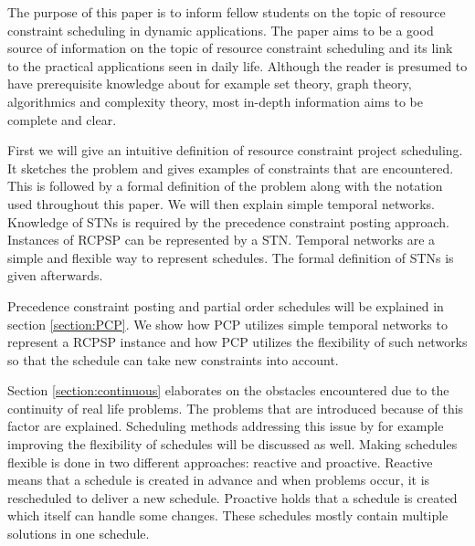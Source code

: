 \documentclass{article}
\begin{document}
The purpose of this paper is to inform fellow students on the topic of resource constraint scheduling in dynamic applications.
The paper aims to be a good source of information on the topic of resource constraint scheduling and its link to the practical applications seen in daily life.
Although the reader is presumed to have prerequisite knowledge about for example set theory, graph theory, algorithmics and complexity theory, most in-depth information aims to be complete and clear.

First we will give an intuitive definition of resource constraint project scheduling. 
It sketches the problem and gives examples of constraints that are encountered. 
This is followed by a formal definition of the problem along with the notation used throughout this paper. 
We will then explain simple temporal networks. 
Knowledge of STNs is required by the precedence constraint posting approach. Instances of RCPSP can be represented by a STN. 
Temporal networks are a simple and flexible way to represent schedules.
The formal definition of STNs is given afterwards. 


Precedence constraint posting and partial order schedules will be explained in section \ref{section:PCP}. 
We show how PCP utilizes simple temporal networks to represent a RCPSP instance and how PCP utilizes the flexibility of such networks so that the schedule can take new constraints into account. 

Section \ref{section:continuous} elaborates on the obstacles encountered due to the continuity of real life problems. 
The problems that are introduced because of this factor are explained. 
Scheduling methods addressing this issue by for example improving the flexibility of schedules will be discussed as well.
Making schedules flexible is done in two different approaches: reactive and proactive.
Reactive means that a schedule is created in advance and when problems occur, it is rescheduled to deliver a new schedule.
Proactive holds that a schedule is created which itself can handle some changes.
These schedules mostly contain multiple solutions in one schedule.
\end{document}
